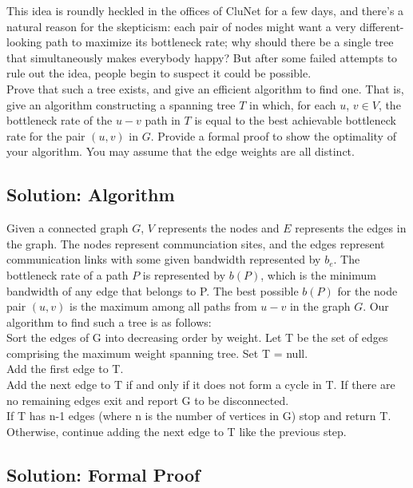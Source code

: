 \documentclass[letter,11pt]{article}
\begin{document}
This idea is roundly heckled in the offices of CluNet for a few days, and there's a natural reason for the skepticism: each pair of nodes might want a very different-looking path to maximize its bottleneck rate; why should there be a single tree that simultaneously makes everybody happy? But after some failed attempts to rule out the idea, people begin to suspect it could be possible.\\


Prove that such a tree exists, and give an efficient algorithm to find one. That is, give an algorithm constructing a spanning tree $T$ in which, for each $u$, $v\in V$, the bottleneck rate of the $u-v$ path in $T$ is equal to the best achievable bottleneck rate for the pair $(u, v)$ in $G$. Provide a formal proof to show the optimality of your algorithm.  You may assume that the edge weights are all distinct.

\subsection{Solution: Algorithm}

Given a connected graph $G$, $V$ represents the nodes and $E$ represents the edges in the graph. The nodes represent communciation sites, and the edges represent communication links with some given bandwidth represented by $b_e$. The bottleneck rate of a path $P$ is represented by $b(P)$, which is the minimum bandwidth of any edge that belongs to P. The best possible $b(P)$ for the node pair $(u, v)$ is the maximum among all paths from $u-v$ in the graph $G$. Our algorithm to find such a tree is as follows:\\

Sort the edges of G into decreasing order by weight. Let T be the set of edges comprising the maximum weight spanning tree. Set T = null.\\

Add the first edge to T.\\

Add the next edge to T if and only if it does not form a cycle in T. If there are no remaining edges exit and report G to be disconnected.\\

If T has n-1 edges (where n is the number of vertices in G) stop and return T. Otherwise, continue adding the next edge to T like the previous step.




\subsection{Solution: Formal Proof}
\end{document}
